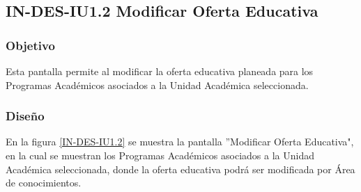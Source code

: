 \subsection{IN-DES-IU1.2 Modificar Oferta Educativa}

\subsubsection{Objetivo}

Esta pantalla permite al  modificar la oferta educativa planeada para los Programas Académicos asociados a la Unidad Académica seleccionada.

\subsubsection{Diseño}

En la figura \ref{IN-DES-IU1.2} se muestra la pantalla ''Modificar Oferta Educativa", en la cual se muestran los Programas Académicos asociados a la Unidad Académica seleccionada, donde la oferta educativa podrá ser modificada por Área de conocimientos.


